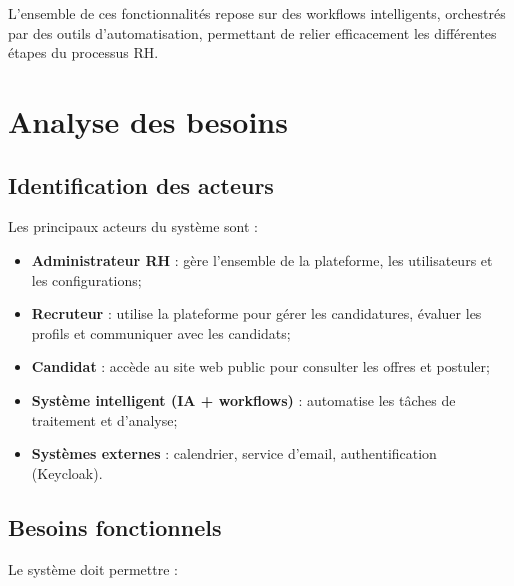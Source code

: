 L'ensemble de ces fonctionnalités repose sur des workflows intelligents, orchestrés par des outils d'automatisation, permettant de relier efficacement les différentes étapes du processus RH.


\section{Analyse des besoins}
\label{sec:analyse-besoins}

\subsection{Identification des acteurs}
\label{subsec:identification-acteurs}

Les principaux acteurs du système sont :

\begin{itemize}
    \item \textbf{Administrateur RH} : gère l'ensemble de la plateforme, les utilisateurs et les configurations;
    
    \item \textbf{Recruteur} : utilise la plateforme pour gérer les candidatures, évaluer les profils et communiquer avec les candidats;
    
    \item \textbf{Candidat} : accède au site web public pour consulter les offres et postuler;
    
    \item \textbf{Système intelligent (IA + workflows)} : automatise les tâches de traitement et d'analyse;
    
    \item \textbf{Systèmes externes} : calendrier, service d'email, authentification (Keycloak).
\end{itemize}


\subsection{Besoins fonctionnels}
\label{subsec:besoins-fonctionnels}

Le système doit permettre :

